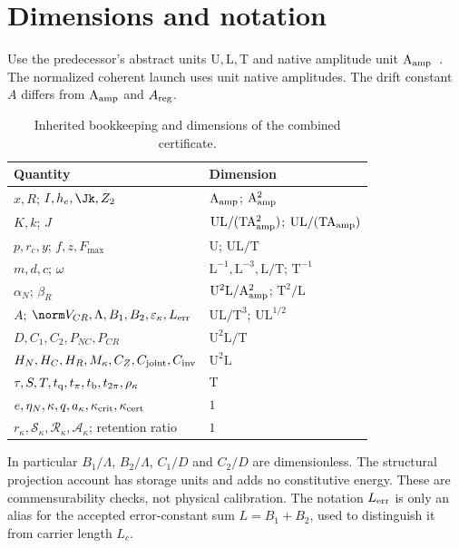 \section{Dimensions and notation}\label{sec:units}
Use the predecessor's abstract units $\mathrm U,\mathrm L,\mathrm T$ and native amplitude unit $\mathrm A_{\rm amp}$~\cite[Section 1]{p1}. The normalized coherent launch uses unit native amplitudes. The drift constant $A$ differs from $\mathrm A_{\rm amp}$ and $A_{\rm reg}$.

\begin{table}[h]
\centering\small
\begin{tabularx}{\textwidth}{@{}P{.48\textwidth}Y@{}}\toprule
Quantity & Dimension\\\midrule
$x,R$; $I,h_e,\Jk,Z_2$ & $\mathrm A_{\rm amp}$; $\mathrm A_{\rm amp}^2$\\[3pt]
$K,k$; $J$ & $\mathrm U\mathrm L/(\mathrm T\mathrm A_{\rm amp}^2)$; $\mathrm U\mathrm L/(\mathrm T\mathrm A_{\rm amp})$\\[3pt]
$p,r_c,y$; $f,z,F_{\max}$ & $\mathrm U$; $\mathrm U\mathrm L/\mathrm T$\\[3pt]
$m,d,c$; $\omega$ & $\mathrm L^{-1},\mathrm L^{-3},\mathrm L/\mathrm T$; $\mathrm T^{-1}$\\[3pt]
$\alpha_N$; $\beta_R$ & $\mathrm U^2\mathrm L/\mathrm A_{\rm amp}^2$; $\mathrm T^2/\mathrm L$\\[3pt]
$A$; $\norm V_{CR},\Lambda,B_1,B_2,\varepsilon_\kappa,L_{\rm err}$ & $\mathrm U\mathrm L/\mathrm T^3$; $\mathrm U\mathrm L^{1/2}$\\[3pt]
$D,C_1,C_2,P_{NC},P_{CR}$ & $\mathrm U^2\mathrm L/\mathrm T$\\[3pt]
$H_N,H_C,H_R,M_\kappa,C_Z,C_{\rm joint},C_{\rm inv}$ & $\mathrm U^2\mathrm L$\\[3pt]
$\tau,S,T,t_{\rm q},t_\pi,t_{\rm b},t_{2\pi},\rho_\kappa$ & $\mathrm T$\\[3pt]
$e,\eta_N,\kappa,q,a_\kappa,\kappa_{\rm crit},\kappa_{\rm cert}$ & $1$\\[3pt]
$r_\kappa,\mathcal S_\kappa,\mathcal R_\kappa,\mathcal A_\kappa$; retention ratio & $1$\\\bottomrule
\end{tabularx}
\caption{Inherited bookkeeping and dimensions of the combined certificate.}\label{tab:units}%
\end{table}

In particular $B_1/\Lambda$, $B_2/\Lambda$, $C_1/D$ and $C_2/D$ are dimensionless. The structural projection account has storage units and adds no constitutive energy. These are commensurability checks, not physical calibration. The notation $L_{\rm err}$ is only an alias for the accepted error-constant sum $L=B_1+B_2$, used to distinguish it from carrier length $L_c$.
